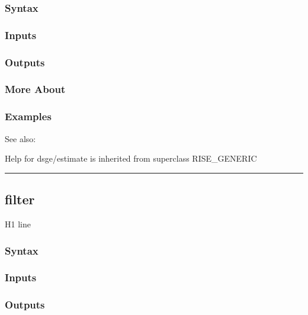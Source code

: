 \documentclass[letterpaper,10pt,english]{sphinxmanual}
\begin{document}
\subsubsection{Syntax}
\label{classes/models/@dsge/dsge:id31}

\subsubsection{Inputs}
\label{classes/models/@dsge/dsge:id32}

\subsubsection{Outputs}
\label{classes/models/@dsge/dsge:id33}

\subsubsection{More About}
\label{classes/models/@dsge/dsge:id34}

\subsubsection{Examples}
\label{classes/models/@dsge/dsge:id35}
See also:

Help for dsge/estimate is inherited from superclass RISE\_GENERIC


\bigskip\hrule{}\bigskip



\subsection{filter}
\label{classes/models/@dsge/dsge:filter}\label{classes/models/@dsge/dsge:id36}
H1 line


\subsubsection{Syntax}
\label{classes/models/@dsge/dsge:id37}

\subsubsection{Inputs}
\label{classes/models/@dsge/dsge:id38}

\subsubsection{Outputs}
\label{classes/models/@dsge/dsge:id39}
\end{document}
